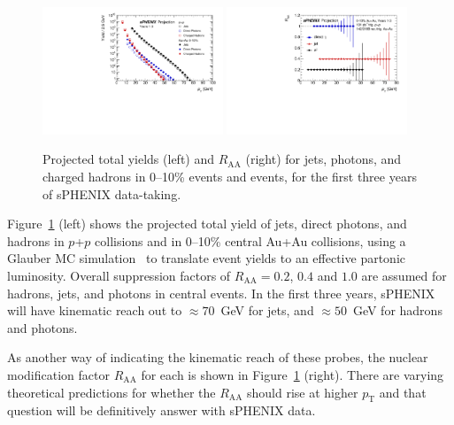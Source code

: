 \begin{figure}[h]
\centering
\includegraphics[width=0.48\textwidth]{figs/master_Years13_yields.pdf}
\includegraphics[width=0.48\textwidth]{figs/RAA_jet_1.pdf}
\caption{Projected total yields (left) and $R_\mathrm{AA}$ (right) for
  jets, photons, and charged hadrons in 0--10\% \auau events and \pp
  events, for the first three years of sPHENIX data-taking.}
\label{fig:jet_RAA_proj}
\end{figure}

Figure~\ref{fig:jet_RAA_proj} (left) shows the projected total yield of
jets, direct photons, and hadrons in $p$+$p$ collisions and in 0--10\%
central Au+Au collisions, using a Glauber MC
simulation~\cite{Miller:2007ri} to translate \auau event yields to an
effective partonic luminosity. Overall suppression factors of
$R_\mathrm{AA} = 0.2$, $0.4$ and $1.0$ are assumed for hadrons, jets,
and photons in central \auau events. In the first three years, sPHENIX
will have kinematic reach out to $\approx 70$~GeV for jets, and
$\approx 50$~GeV for hadrons and photons.

As another way of indicating the kinematic reach of these probes, the
nuclear modification factor $R_\mathrm{AA}$ for each is shown in
Figure~\ref{fig:jet_RAA_proj} (right).   There are varying theoretical predictions
for whether the $R_\mathrm{AA}$ should rise at higher $p_\mathrm{T}$ and that question will be 
definitively answer with sPHENIX data.

